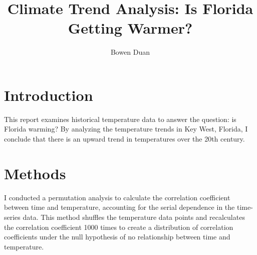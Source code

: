 \documentclass[10pt]{article}
\title{Climate Trend Analysis: Is Florida Getting Warmer?}
\author{Bowen Duan}
\begin{document}
\maketitle

\section{Introduction}
This report examines historical temperature data to answer the question: is Florida warming? By analyzing the temperature trends in Key West, Florida, I conclude that there is an upward trend in temperatures over the 20th century.

\section{Methods}
I conducted a permutation analysis to calculate the correlation coefficient between time and temperature, accounting for the serial dependence in the time-series data. This method shuffles the temperature data points and recalculates the correlation coefficient 1000 times to create a distribution of correlation coefficients under the null hypothesis of no relationship between time and temperature.
\end{document}
